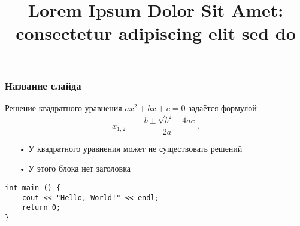 \documentclass[svgnames]{beamer}
\title{Lorem Ipsum Dolor Sit Amet: consectetur adipiscing elit sed do}
\author{\texorpdfstring{
    \Author{Артур Игнатьев}{руководитель CS Space}
    \Author{Борис Золотов}{\TeX ал}
}{}}
\begin{document}
\maketitle

\renewcommand{\titlebackground}{\inktemplate}

\maketitle


\begin{frame}[fragile] \frametitle{Название слайда}

Решение квадратного уравнения \(ax^2 + bx + c = 0\)
задаётся формулой \[x_{1,2} = \dfrac{-b \pm \sqrt{b^2 - 4ac}}{2a}.\]

\begin{block}{\vspace*{-3ex}}
    \begin{itemize}
        \item[•] У квадратного уравнения может не существовать решений
        \item[•] У этого блока нет заголовка
    \end{itemize}
\end{block}

\begin{lstlisting}
int main () {
    cout << "Hello, World!" << endl;
    return 0;
}
\end{lstlisting}

\end{frame}
\end{document}
